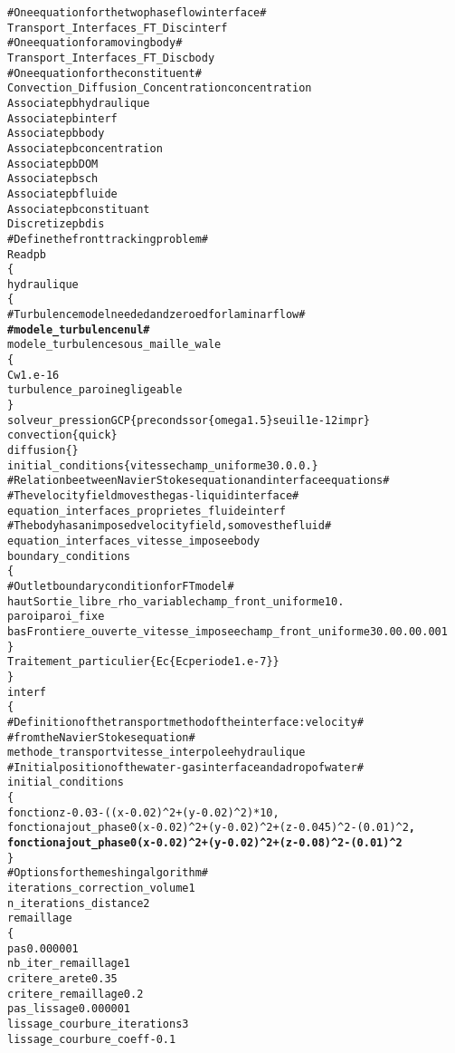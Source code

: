 \begin{alltt}
# One equation for the two phase flow interface #
Transport_Interfaces_FT_Disc       interf
# One equation for a moving body #
Transport_Interfaces_FT_Disc       body
# One equation for the constituent #
Convection_Diffusion_Concentration concentration
Associate pb hydraulique
Associate pb interf
Associate pb body
Associate pb concentration
Associate pb DOM
Associate pb sch
Associate pb fluide
Associate pb constituant
Discretize pb dis
# Define the front tracking problem #
Read pb
\{
    hydraulique
    \{
        # Turbulence model needed and zeroed for laminar flow #
        {\bf{# modele_turbulence nul #}}
        modele_turbulence sous_maille_wale
        \{
            Cw               1.e-16
            turbulence_paroi negligeable
        \}
        solveur_pression GCP \{ precond ssor \{ omega 1.5 \} seuil 1e-12 impr \}
        convection           \{ quick \}
        diffusion            \{ \}
        initial_conditions \{ vitesse champ_uniforme 3 0. 0. 0. \}
        # Relation beetween Navier Stokes equation and interface equations #
        # The velocity field moves the gas-liquid interface #
        equation_interfaces_proprietes_fluide interf 
        # The body has an imposed velocity field, so moves the fluid #
        equation_interfaces_vitesse_imposee   body
        boundary_conditions
        \{
            # Outlet boundary condition for FT model #
            haut   Sortie_libre_rho_variable champ_front_uniforme 1 0.    
            paroi  paroi_fixe
            bas    Frontiere_ouverte_vitesse_imposee champ_front_uniforme 3 0.0 0.0 0.001
        \}
        Traitement_particulier \{ Ec \{ Ec periode 1.e-7 \} \}
    \}
    interf
    \{
        # Definition of the transport method of the interface: velocity #
        # from the Navier Stokes equation #
        methode_transport vitesse_interpolee hydraulique
        # Initial position of the water-gas interface and a drop of water #
        initial_conditions 
        \{
            fonction z-0.03-((x-0.02)^2+(y-0.02)^2)*10 ,
            fonction ajout_phase0 (x-0.02)^2+(y-0.02)^2+(z-0.045)^2-(0.01)^2 {\bf{,}}
            {\bf{fonction ajout_phase0 (x-0.02)^2+(y-0.02)^2+(z-0.08)^2-(0.01)^2 }}
        \}
        # Options for the meshing algorithm #
        iterations_correction_volume 1
        n_iterations_distance 2
        remaillage 
        \{
            pas 0.000001
            nb_iter_remaillage 1
            critere_arete 0.35
            critere_remaillage 0.2
            pas_lissage 0.000001
            lissage_courbure_iterations 3
            lissage_courbure_coeff -0.1

\end{alltt}

